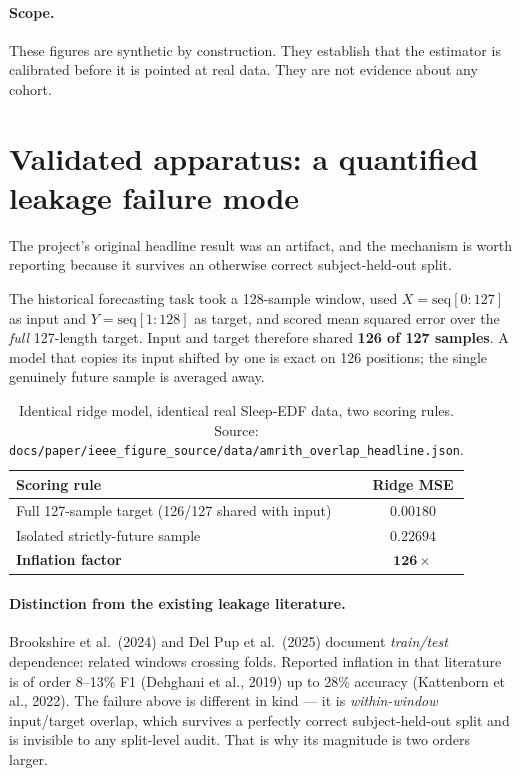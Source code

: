\documentclass[11pt]{article}
\begin{document}
\paragraph{Scope.} These figures are synthetic by construction. They establish
that the estimator is calibrated before it is pointed at real data. They are not
evidence about any cohort.

\section{Validated apparatus: a quantified leakage failure mode}
\label{sec:leak}

The project's original headline result was an artifact, and the mechanism is
worth reporting because it survives an otherwise correct subject-held-out split.

The historical forecasting task took a 128-sample window, used
$X = \mathrm{seq}[0{:}127]$ as input and $Y = \mathrm{seq}[1{:}128]$ as target,
and scored mean squared error over the \emph{full} 127-length target. Input and
target therefore shared \textbf{126 of 127 samples}. A model that copies its input
shifted by one is exact on 126 positions; the single genuinely future sample is
averaged away.

\begin{table}[h]
\centering
\small
\caption{Identical ridge model, identical real Sleep-EDF data, two scoring rules.
Source: \texttt{docs/paper/ieee\_figure\_source/data/amrith\_overlap\_headline.json}.}
\begin{tabular}{@{}lc@{}}
\toprule
Scoring rule & Ridge MSE \\
\midrule
Full 127-sample target (126/127 shared with input) & $0.00180$ \\
Isolated strictly-future sample & $0.22694$ \\
\midrule
\textbf{Inflation factor} & $\mathbf{126\times}$ \\
\bottomrule
\end{tabular}
\end{table}

\paragraph{Distinction from the existing leakage literature.} Brookshire et
al.~(2024) and Del Pup et al.~(2025) document \emph{train/test} dependence:
related windows crossing folds. Reported inflation in that literature is of order
8--13\% F1 (Dehghani et al., 2019) up to 28\% accuracy (Kattenborn et al., 2022).
The failure above is different in kind --- it is \emph{within-window} input/target
overlap, which survives a perfectly correct subject-held-out split and is
invisible to any split-level audit. That is why its magnitude is two orders larger.
\end{document}
